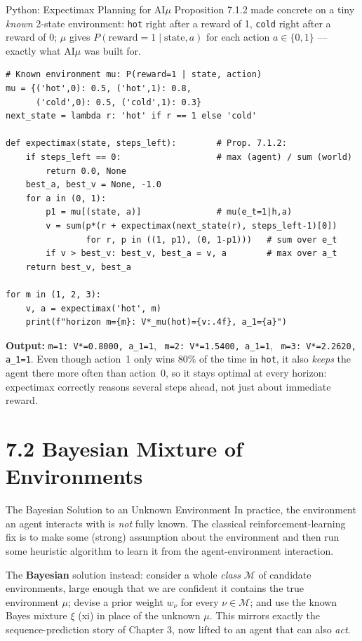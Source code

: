 \documentclass[aspectratio=169,10pt]{beamer}
\newcommand{\Mcal}{\mathcal{M}}
\begin{document}
\begin{frame}[fragile]{Python: Expectimax Planning for AI$\mu$}
  \small Proposition 7.1.2 made concrete on a tiny \emph{known} 2-state
  environment: \texttt{hot} right after a reward of 1, \texttt{cold} right
  after a reward of 0; $\mu$ gives $P(\text{reward}=1\mid\text{state},a)$
  for each action $a\in\{0,1\}$ --- exactly what AI$\mu$ was built for.
  \begin{lstlisting}
# Known environment mu: P(reward=1 | state, action)
mu = {('hot',0): 0.5, ('hot',1): 0.8,
      ('cold',0): 0.5, ('cold',1): 0.3}
next_state = lambda r: 'hot' if r == 1 else 'cold'

def expectimax(state, steps_left):        # Prop. 7.1.2:
    if steps_left == 0:                   # max (agent) / sum (world)
        return 0.0, None
    best_a, best_v = None, -1.0
    for a in (0, 1):
        p1 = mu[(state, a)]               # mu(e_t=1|h,a)
        v = sum(p*(r + expectimax(next_state(r), steps_left-1)[0])
                for r, p in ((1, p1), (0, 1-p1)))   # sum over e_t
        if v > best_v: best_v, best_a = v, a        # max over a_t
    return best_v, best_a

for m in (1, 2, 3):
    v, a = expectimax('hot', m)
    print(f"horizon m={m}: V*_mu(hot)={v:.4f}, a_1={a}")
  \end{lstlisting}
  \textbf{Output:} \texttt{m=1: V*=0.8000, a\_1=1}, \ \texttt{m=2: V*=1.5400,
  a\_1=1}, \ \texttt{m=3: V*=2.2620, a\_1=1}. Even though action~1 only wins
  $80\%$ of the time in \texttt{hot}, it also \emph{keeps} the agent there
  more often than action~0, so it stays optimal at every horizon: expectimax
  correctly reasons several steps ahead, not just about immediate reward.
\end{frame}

\section{7.2 Bayesian Mixture of Environments}

\begin{frame}{The Bayesian Solution to an Unknown Environment}
  In practice, the environment an agent interacts with is \emph{not} fully
  known. The classical reinforcement-learning fix is to make some (strong)
  assumption about the environment and then run some heuristic algorithm to
  learn it from the agent-environment interaction.

  \vspace{2mm}
  The \textbf{Bayesian} solution instead: consider a whole \emph{class}
  $\Mcal$ of candidate environments, large enough that we are confident it
  contains the true environment $\mu$; devise a prior weight $w_\nu$ for
  every $\nu\in\Mcal$; and use the known Bayes mixture $\xi$ (xi) in place
  of the unknown $\mu$. This mirrors exactly the sequence-prediction story
  of Chapter 3, now lifted to an agent that can also \emph{act}.
\end{frame}
\end{document}
